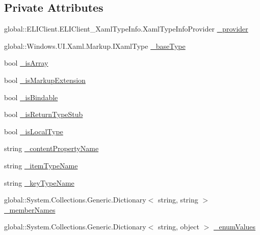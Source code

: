 \subsection*{Private Attributes}
\begin{DoxyCompactItemize}
\item 
global\+::\+E\+L\+I\+Client.\+E\+L\+I\+Client\+\_\+\+Xaml\+Type\+Info.\+Xaml\+Type\+Info\+Provider \hyperlink{class_e_l_i_client_1_1_e_l_i_client___xaml_type_info_1_1_xaml_user_type_a32b4b18aae7b4f63fccfa57c027c6c59}{\+\_\+provider}
\item 
global\+::\+Windows.\+U\+I.\+Xaml.\+Markup.\+I\+Xaml\+Type \hyperlink{class_e_l_i_client_1_1_e_l_i_client___xaml_type_info_1_1_xaml_user_type_a84b4c15ec3633447403ce5a4b2b1a0d4}{\+\_\+base\+Type}
\item 
bool \hyperlink{class_e_l_i_client_1_1_e_l_i_client___xaml_type_info_1_1_xaml_user_type_a26a85d74b05df9037b2edc05b8e5462f}{\+\_\+is\+Array}
\item 
bool \hyperlink{class_e_l_i_client_1_1_e_l_i_client___xaml_type_info_1_1_xaml_user_type_a02978d6a1ef3b9188494d7d69f09bd33}{\+\_\+is\+Markup\+Extension}
\item 
bool \hyperlink{class_e_l_i_client_1_1_e_l_i_client___xaml_type_info_1_1_xaml_user_type_a5695c06f882f2a5feadfe5b43dbefae6}{\+\_\+is\+Bindable}
\item 
bool \hyperlink{class_e_l_i_client_1_1_e_l_i_client___xaml_type_info_1_1_xaml_user_type_a901f700847f3fae4abff12b0260ef7c0}{\+\_\+is\+Return\+Type\+Stub}
\item 
bool \hyperlink{class_e_l_i_client_1_1_e_l_i_client___xaml_type_info_1_1_xaml_user_type_a345f429c448714e784845c5b893b195b}{\+\_\+is\+Local\+Type}
\item 
string \hyperlink{class_e_l_i_client_1_1_e_l_i_client___xaml_type_info_1_1_xaml_user_type_a2e8843ddb38fe503fab643c79623e97c}{\+\_\+content\+Property\+Name}
\item 
string \hyperlink{class_e_l_i_client_1_1_e_l_i_client___xaml_type_info_1_1_xaml_user_type_a2ebff3d697ea9a1c5985e29b68fdc7dc}{\+\_\+item\+Type\+Name}
\item 
string \hyperlink{class_e_l_i_client_1_1_e_l_i_client___xaml_type_info_1_1_xaml_user_type_ac008722412c3f893dfbdb3ca1343ba61}{\+\_\+key\+Type\+Name}
\item 
global\+::\+System.\+Collections.\+Generic.\+Dictionary$<$ string, string $>$ \hyperlink{class_e_l_i_client_1_1_e_l_i_client___xaml_type_info_1_1_xaml_user_type_af5901985cdd3f62f6aee5122e024a4ec}{\+\_\+member\+Names}
\item 
global\+::\+System.\+Collections.\+Generic.\+Dictionary$<$ string, object $>$ \hyperlink{class_e_l_i_client_1_1_e_l_i_client___xaml_type_info_1_1_xaml_user_type_a413f3bb261bd0c3a800726efee8ad22e}{\+\_\+enum\+Values}
\end{DoxyCompactItemize}


